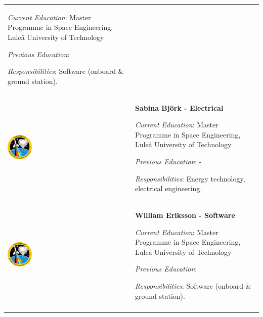\begin{longtable}[]{m{} m{}}
\smallskip
\textit{Current Education}: Master Programme in Space Engineering, Luleå University of Technology

\smallskip
\textit{Previous Education}:

\smallskip
\textit{Responsibilities}: Software (onboard \& ground station).
\bigskip
\\

\includegraphics[width=0.2\textwidth]{0-cover/img/logo-rexus-bexus.png}  & \textbf{Sabina Bj\"ork - Electrical}

\smallskip
\textit{Current Education}: Master Programme in Space Engineering, Luleå University of Technology


\smallskip
\textit{Previous Education}: -

\smallskip
\textit{Responsibilities}: Energy technology, electrical engineering.
\bigskip
\\

\includegraphics[width=0.2\textwidth]{0-cover/img/logo-rexus-bexus.png}  & \textbf{William Eriksson - Software}

\smallskip
\textit{Current Education}: Master Programme in Space Engineering, Luleå University of Technology

\smallskip
\textit{Previous Education}:

\smallskip
\textit{Responsibilities}: Software (onboard \& ground station).
\bigskip
\\

\label{tab:people}
\end{longtable}
\raggedbottom
